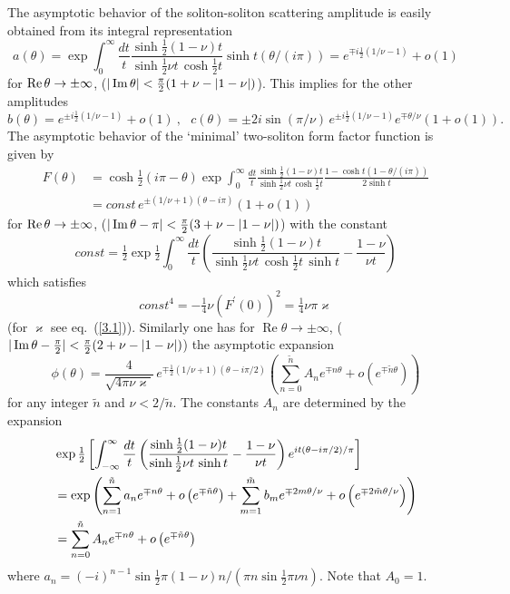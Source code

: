 \documentclass[a4paper,a4paper]{article}
\begin{document}
\label{a2}The asymptotic behavior of the soliton-soliton scattering
amplitude is easily obtained from its integral representation 
\[
a(\theta )=\exp \int_{0}^{\infty }\frac{dt}{t}\frac{\sinh \frac{1}{2}(1-\nu
)t}{\sinh \frac{1}{2}\nu t\,\cosh \frac{1}{2}t}\sinh t(\theta /(i\pi
))=e^{\mp i\frac{1}{2}(1/\nu -1)}+o(1) 
\]
for $\mathop{\rm Re}\theta \to \pm \infty $, ($|\mathop{\rm Im}\theta |<%
\frac{\pi }{2}(1+\nu -|1-\nu |)$). This implies for the other amplitudes 
\[
b(\theta )=e^{\pm i\frac{1}{2}(1/\nu -1)}+o(1)~,~~~c(\theta )=\pm 2i\sin
(\pi /\nu )\,e^{\pm i\frac{1}{2}(1/\nu -1)}e^{\mp \theta /\nu }\left(
1+o(1)\right) . 
\]
The asymptotic behavior of the `minimal' two-soliton form factor function is
given by 
\begin{align*}
F(\theta )& =\cosh \tfrac{1}{2}\left( i\pi -\theta \right) \exp
\int_{0}^{\infty }\frac{dt}{t}\frac{\sinh \frac{1}{2}(1-\nu )t}{\sinh \frac{1%
}{2}\nu t\,\cosh \frac{1}{2}t}\frac{1-\cosh t(1-\theta /(i\pi ))}{2\sinh t}
\\
& =const\,e^{\pm \left( 1/\nu +1\right) (\theta -i\pi )}(1+o(1))
\end{align*}
for $\mathop{\rm Re}\theta \to \pm \infty $, ($|\mathop{\rm Im}\theta -\pi |<%
\frac{\pi }{2}(3+\nu -|1-\nu |)$) with the constant 
\[
const=\tfrac{1}{2}\exp \tfrac{1}{2}\int_{0}^{\infty }\frac{dt}{t}\left( 
\frac{\sinh \frac{1}{2}(1-\nu )t}{\sinh \frac{1}{2}\nu t\,\cosh \frac{1}{2}%
t\,\sinh t}-\frac{1-\nu }{\nu t}\right) 
\]
which satisfies 
\[
const^{4}=-\tfrac{1}{4}\nu \left( F^{\prime }(0)\right) ^{2}=\tfrac{1}{4}\nu
\pi \varkappa 
\]
(for $\varkappa $ see eq.~(\ref{3.1})). Similarly one has for $\mathop%
\mathrm{Re}\theta \to \pm \infty $, ($|\mathop{\rm Im}\theta -\frac{\pi }{2}%
|<\frac{\pi }{2}(2+\nu -|1-\nu |)$) the asymptotic expansion 
\[
\phi (\theta )=\frac{4}{\sqrt{4\pi \nu \varkappa }}\,e^{\mp \frac{1}{2}%
(1/\nu +1)(\theta -i\pi /2)}\left( \sum_{n=0}^{\tilde{n}}A_{n}e^{\mp n\theta
}+o\left( e^{\mp \tilde{n}\theta }\right) \right) 
\]
for any integer $\tilde{n}$ and $\nu <2/\tilde{n}$. The constants $A_{n}$
are determined by the expansion 
\begin{align*}
& \exp \tfrac{1}{2}\left[ \int_{-\infty }^{\infty }\frac{dt}{t}\left( \frac{%
\sinh \frac{1}{2}(1-\nu )t}{\sinh \frac{1}{2}\nu t\,\sinh t}-\frac{1-\nu }{%
\nu t}\right) e^{it\left( \theta -i\pi /2\right) /\pi }\right] \\
& =\exp \left( \sum_{n=1}^{\tilde{n}}a_{n}e^{\mp n\theta }+o\left( e^{\mp 
\tilde{n}\theta }\right) +\sum_{m=1}^{\tilde{m}}b_{m}e^{\mp 2m\theta /\nu
}+o\left( e^{\mp 2\tilde{m}\theta /\nu }\right) \right) \\
& =\sum_{n=0}^{\tilde{n}}A_{n}e^{\mp n\theta }+o\left( e^{\mp \tilde{n}%
\theta }\right)
\end{align*}
where $a_{n}=(-i)^{n-1}\sin \frac{1}{2}\pi (1-\nu )n/\left( \pi n\sin \frac{1%
}{2}\pi \nu n\right) $. Note that $A_{0}=1$.
\end{document}
